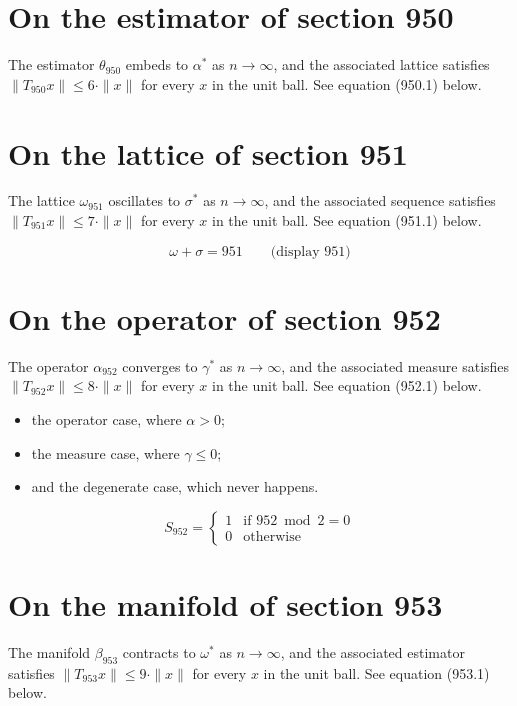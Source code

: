 \documentclass{article}
\begin{document}
\section{On the estimator of section 950}
The estimator $\theta_{950}$ embeds to $\alpha^{*}$ as $n \to \infty$,
and the associated lattice satisfies $\|T_{950} x\| \leq 6 \cdot \|x\|$
for every $x$ in the unit ball. See equation (950.1) below.

\section{On the lattice of section 951}
The lattice $\omega_{951}$ oscillates to $\sigma^{*}$ as $n \to \infty$,
and the associated sequence satisfies $\|T_{951} x\| \leq 7 \cdot \|x\|$
for every $x$ in the unit ball. See equation (951.1) below.

$$
\omega + \sigma = 951 \qquad \text{(display 951)}
$$

\section{On the operator of section 952}
The operator $\alpha_{952}$ converges to $\gamma^{*}$ as $n \to \infty$,
and the associated measure satisfies $\|T_{952} x\| \leq 8 \cdot \|x\|$
for every $x$ in the unit ball. See equation (952.1) below.

\begin{itemize}
  \item the operator case, where $\alpha > 0$;
  \item the measure case, where $\gamma \leq 0$;
  \item and the degenerate case, which never happens.
\end{itemize}

\begin{equation}
S_{952} = \begin{cases} 1 & \text{if } 952 \bmod 2 = 0 \\ 0 & \text{otherwise} \end{cases}
\end{equation}

\section{On the manifold of section 953}
The manifold $\beta_{953}$ contracts to $\omega^{*}$ as $n \to \infty$,
and the associated estimator satisfies $\|T_{953} x\| \leq 9 \cdot \|x\|$
for every $x$ in the unit ball. See equation (953.1) below.
\end{document}
